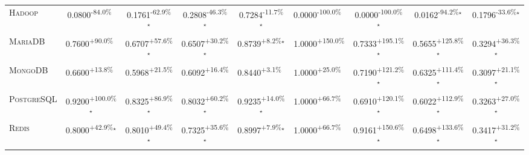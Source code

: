 \begin{table}[htbp]
\begin{tabular}{l|cccc|cccc}
\textsc{Hadoop} & \cellcolor{red!30}0.0800\textsuperscript{-84.0\%}$^{\,\,\,}$ & \cellcolor{red!30}0.1761\textsuperscript{-62.9\%}$^\star$ & \cellcolor{red!30}0.2808\textsuperscript{-46.3\%}$^\star$ & \cellcolor{red!30}0.7284\textsuperscript{-11.7\%}$^\star$ & \cellcolor{red!30}0.0000\textsuperscript{-100.0\%}$^{\,\,\,}$ & \cellcolor{red!30}0.0000\textsuperscript{-100.0\%}$^\star$ & \cellcolor{red!30}0.0162\textsuperscript{-94.2\%}$^\star$ & \cellcolor{red!30}0.1796\textsuperscript{-33.6\%}$^\star$ \\
\textsc{MariaDB} & \cellcolor{green!30}0.7600\textsuperscript{+90.0\%}$^{\,\,\,}$ & \cellcolor{green!30}0.6707\textsuperscript{+57.6\%}$^\star$ & \cellcolor{green!30}0.6507\textsuperscript{+30.2\%}$^\star$ & \cellcolor{green!30}0.8739\textsuperscript{+8.2\%}$^\star$ & \cellcolor{green!30}1.0000\textsuperscript{+150.0\%}$^{\,\,\,}$ & \cellcolor{green!30}0.7333\textsuperscript{+195.1\%}$^\star$ & \cellcolor{green!30}0.5655\textsuperscript{+125.8\%}$^\star$ & \cellcolor{green!30}0.3294\textsuperscript{+36.3\%}$^\star$ \\
\textsc{MongoDB} & \cellcolor{green!30}0.6600\textsuperscript{+13.8\%}$^{\,\,\,}$ & \cellcolor{green!30}0.5968\textsuperscript{+21.5\%}$^{\,\,\,}$ & \cellcolor{green!30}0.6092\textsuperscript{+16.4\%}$^{\,\,\,}$ & \cellcolor{green!30}0.8440\textsuperscript{+3.1\%}$^{\,\,\,}$ & \cellcolor{green!30}1.0000\textsuperscript{+25.0\%}$^{\,\,\,}$ & \cellcolor{green!30}0.7190\textsuperscript{+121.2\%}$^\star$ & \cellcolor{green!30}0.6325\textsuperscript{+111.4\%}$^\star$ & \cellcolor{green!30}0.3097\textsuperscript{+21.1\%}$^\star$ \\
\textsc{PostgreSQL} & \cellcolor{green!30}0.9200\textsuperscript{+100.0\%}$^\star$ & \cellcolor{green!30}0.8325\textsuperscript{+86.9\%}$^\star$ & \cellcolor{green!30}0.8032\textsuperscript{+60.2\%}$^\star$ & \cellcolor{green!30}0.9235\textsuperscript{+14.0\%}$^\star$ & \cellcolor{green!30}1.0000\textsuperscript{+66.7\%}$^{\,\,\,}$ & \cellcolor{green!30}0.6910\textsuperscript{+120.1\%}$^\star$ & \cellcolor{green!30}0.6022\textsuperscript{+112.9\%}$^\star$ & \cellcolor{green!30}0.3263\textsuperscript{+27.0\%}$^\star$ \\
\textsc{Redis} & \cellcolor{green!30}0.8000\textsuperscript{+42.9\%}$^\star$ & \cellcolor{green!30}0.8010\textsuperscript{+49.4\%}$^\star$ & \cellcolor{green!30}0.7325\textsuperscript{+35.6\%}$^\star$ & \cellcolor{green!30}0.8997\textsuperscript{+7.9\%}$^\star$ & \cellcolor{green!30}1.0000\textsuperscript{+66.7\%}$^{\,\,\,}$ & \cellcolor{green!30}0.9161\textsuperscript{+150.6\%}$^\star$ & \cellcolor{green!30}0.6498\textsuperscript{+133.6\%}$^\star$ & \cellcolor{green!30}0.3417\textsuperscript{+31.2\%}$^\star$ \\

\end{tabular}
\end{table}
